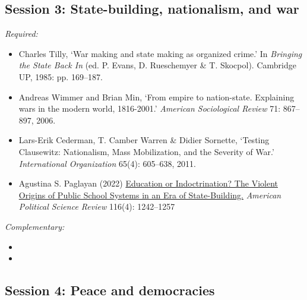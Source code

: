 \documentclass[12pt, a4paper]{article}
\begin{document}
\hline
\subsection*{Session 3: State-building, nationalism, and war}

\noindent\textit{Required:}

\begin{itemize}
  \item Charles Tilly, `War making and state making as organized crime.' In \textit{Bringing the State Back In} (ed. P. Evans, D. Rueschemyer \& T. Skocpol). Cambridge UP, 1985: pp. 169--187.
  \item Andreas Wimmer and Brian Min, `From empire to nation-state. Explaining wars in the modern world, 1816-2001.' \textit{American Sociological Review} 71: 867--897, 2006.
  \item Lars-Erik Cederman, T. Camber Warren \& Didier Sornette, `Testing Clausewitz: Nationalism, Mass Mobilization, and the Severity of War.' \textit{International Organization} 65(4): 605--638, 2011.
  \item Agustina S. Paglayan (2022) \href{https://doi.org/10.1017/S0003055422000247}{Education or Indoctrination? The Violent Origins of Public School Systems in an Era of State-Building.} \textit{American Political Science Review} 116(4): 1242--1257
\end{itemize}

\noindent\textit{Complementary:}

\begin{itemize}
  \item
  \item
\end{itemize}

\hline
\subsection*{Session 4: Peace and democracies}

\end{document}

